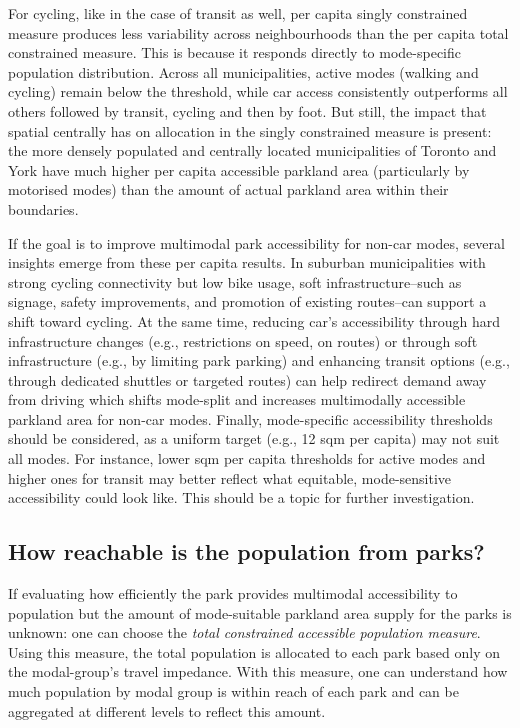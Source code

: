 \documentclass[
11pt, %
oneside, %
english, %
singlespacing, %
]{macthesis} %
\begin{document}
For cycling, like in the case of transit as well, per capita singly constrained measure produces less variability across neighbourhoods than the per capita total constrained measure. This is because it responds directly to mode-specific population distribution. Across all municipalities, active modes (walking and cycling) remain below the threshold, while car access consistently outperforms all others followed by transit, cycling and then by foot. But still, the impact that spatial centrally has on allocation in the singly constrained measure is present: the more densely populated and centrally located municipalities of Toronto and York have much higher per capita accessible parkland area (particularly by motorised modes) than the amount of actual parkland area within their boundaries.

If the goal is to improve multimodal park accessibility for non-car modes, several insights emerge from these per capita results. In suburban municipalities with strong cycling connectivity but low bike usage, soft infrastructure--such as signage, safety improvements, and promotion of existing routes--can support a shift toward cycling. At the same time, reducing car's accessibility through hard infrastructure changes (e.g., restrictions on speed, on routes) or through soft infrastructure (e.g., by limiting park parking) and enhancing transit options (e.g., through dedicated shuttles or targeted routes) can help redirect demand away from driving which shifts mode-split and increases multimodally accessible parkland area for non-car modes. Finally, mode-specific accessibility thresholds should be considered, as a uniform target (e.g., 12 sqm per capita) may not suit all modes. For instance, lower sqm per capita thresholds for active modes and higher ones for transit may better reflect what equitable, mode-sensitive accessibility could look like. This should be a topic for further investigation.

\subsection{\texorpdfstring{\textbf{How reachable is the population from parks?}}{How reachable is the population from parks?}}\label{how-reachable-is-the-population-from-parks}

If evaluating how efficiently the park provides multimodal accessibility to population but the amount of mode-suitable parkland area supply for the parks is unknown: one can choose the \emph{total constrained accessible population measure}. Using this measure, the total population is allocated to each park based only on the modal-group's travel impedance. With this measure, one can understand how much population by modal group is within reach of each park and can be aggregated at different levels to reflect this amount.
\end{document}
